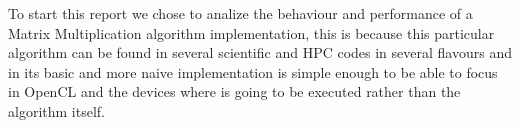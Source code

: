 \par{To start this report we chose to analize the behaviour and performance of 
    a Matrix Multiplication algorithm 
    implementation, this is because this particular algorithm can be found in 
    several scientific and HPC codes in several flavours
    and in its basic and more naive implementation is simple enough to be 
    able to focus in OpenCL and the devices where is going to be 
    executed rather than the algorithm itself.}

